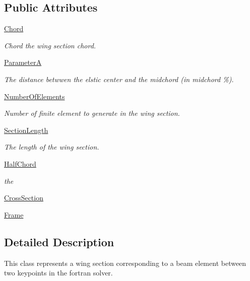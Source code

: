 \subsection*{Public Attributes}
\begin{DoxyCompactItemize}
\item 
\hyperlink{classgebtaero_1_1_wing_section_1_1_wing_section_a844f4ac911b02212eb5c8a3d04bc2626}{Chord}
\begin{DoxyCompactList}\small\item\em Chord the wing section chord. \end{DoxyCompactList}\item 
\hyperlink{classgebtaero_1_1_wing_section_1_1_wing_section_a0da2330696a15bce08b3ac29b2efaf17}{ParameterA}
\begin{DoxyCompactList}\small\item\em The distance betwwen the elstic center and the midchord (in midchord \%). \end{DoxyCompactList}\item 
\hyperlink{classgebtaero_1_1_wing_section_1_1_wing_section_a350cd9770457b51a9fc2d8c5a1171bf0}{Number\+Of\+Elements}
\begin{DoxyCompactList}\small\item\em Number of finite element to generate in the wing section. \end{DoxyCompactList}\item 
\hyperlink{classgebtaero_1_1_wing_section_1_1_wing_section_a87909d32978a886e9e329df69f7d918e}{Section\+Length}
\begin{DoxyCompactList}\small\item\em The length of the wing section. \end{DoxyCompactList}\item 
\hyperlink{classgebtaero_1_1_wing_section_1_1_wing_section_a6b0d6833d40f1de17a90670b2d93f1d7}{Half\+Chord}
\begin{DoxyCompactList}\small\item\em the \end{DoxyCompactList}\item 
\hyperlink{classgebtaero_1_1_wing_section_1_1_wing_section_a66c05b18f3b13c9ab00815cb938fed49}{Cross\+Section}
\item 
\hyperlink{classgebtaero_1_1_wing_section_1_1_wing_section_a33e1121a1f998bf192ab4bb39d22d76a}{Frame}
\end{DoxyCompactItemize}


\subsection{Detailed Description}
This class represents a wing section corresponding to a beam element between two keypoints in the fortran solver. 


